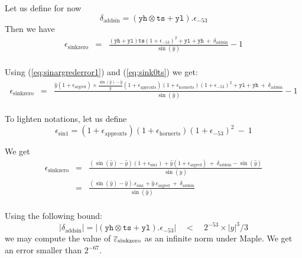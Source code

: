 Let us define for now
\begin{equation}
  \delta_{\mathrm{addsin}} = (\mathtt{yh}\otimes\mathtt{ts} + \mathtt{yl}).\epsilon_{-53}
\label{eq:addsin}
\end{equation}
Then we have
\begin{eqnarray*}
  \epsilon_{\mathrm{sinkzero}}
  &=& \frac{(\mathtt{yh} + \mathtt{yl})\mathtt{ts}(1+\epsilon_{-53})^2 + \mathtt{yl} + \mathtt{yh}    \ +\  \delta_{\mathrm{addsin}} }{\sin(\hat{y})} -1\\
\end{eqnarray*}

Using (\ref{eq:sinargrederror1}) and (\ref{eq:sink0ts}) we get:
\begin{eqnarray*}
  \epsilon_{\mathrm{sinkzero}}
  &=& \frac{\hat{y}(1+\epsilon_{\mathrm{argred}})\times\frac{\sin(\hat{y})-\hat{y}}{\hat{y}}(1+\epsilon_{\mathrm{approxts}})(1+\epsilon_{\mathrm{hornerts}})(1+\epsilon_{-53})^2 + \mathtt{yl} + \mathtt{yh}    \ +\  \delta_{\mathrm{addsin}} }{\sin(\hat{y})} -1\\
\end{eqnarray*}

To lighten notations, let us define
\begin{equation}
 \epsilon_{\mathrm{sin1}} = (1+\epsilon_{\mathrm{approxts}})(1+\epsilon_{\mathrm{hornerts}})(1+\epsilon_{-53})^2 \ -\ 1
  \label{eq:epssin1}
\end{equation}

We get
\begin{eqnarray*}
  \epsilon_{\mathrm{sinkzero}}
  &=& \frac{(\sin(\hat{y})-\hat{y})(1+\epsilon_{\mathrm{sin1}}) + \hat{y}(1+\epsilon_{\mathrm{argred}})    \ +\   \delta_{\mathrm{addsin}} - \sin(\hat{y})}{\sin(\hat{y})}\\
  &=& \frac{(\sin(\hat{y})-\hat{y}).\epsilon_{\mathrm{sin1}} + \hat{y}.\epsilon_{\mathrm{argred}}    \ +\ \delta_{\mathrm{addsin}}}{\sin(\hat{y})}\\
\label{eq:sinkzero}
\end{eqnarray*}

Using the following bound:
\begin{equation}
  |\delta_{\mathrm{addsin}}| = |(\mathtt{yh}\otimes\mathtt{ts} + \mathtt{yl}).\epsilon_{-53}| \quad < \quad 2^{-53}\times |y|^3/3
\end{equation}
 we may compute the value of ${\overline{\varepsilon}}_{\mathrm{sinkzero}}$ as an
infinite norm under Maple. We get an error smaller than $2^{-67}.$



